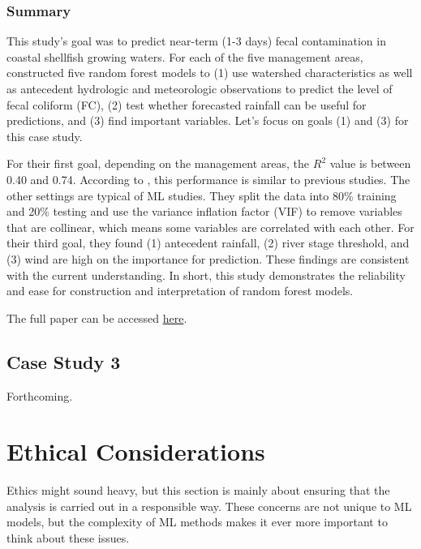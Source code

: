 \documentclass[
]{book}
\begin{document}
\hypertarget{summary-1}{%
\subsection{Summary}\label{summary-1}}

This study's goal was to predict near-term (1-3 days) fecal contamination in coastal shellfish growing waters. For each of the five management areas, \citet{chazal2024} constructed five random forest models to (1) use watershed characteristics as well as antecedent hydrologic and meteorologic observations to predict the level of fecal coliform (FC), (2) test whether forecasted rainfall can be useful for predictions, and (3) find important variables. Let's focus on goals (1) and (3) for this case study.

For their first goal, depending on the management areas, the \(R^2\) value is between 0.40 and 0.74. According to \citet{chazal2024}, this performance is similar to previous studies. The other settings are typical of ML studies. They split the data into 80\% training and 20\% testing and use the variance inflation factor (VIF) to remove variables that are collinear, which means some variables are correlated with each other. For their third goal, they found (1) antecedent rainfall, (2) river stage threshold, and (3) wind are high on the importance for prediction. These findings are consistent with the current understanding. In short, this study demonstrates the reliability and ease for construction and interpretation of random forest models.

The full paper can be accessed \href{https://www.sciencedirect.com/science/article/pii/S0025326X24000304?via\%3Dihub}{here}.

\hypertarget{case-study-3}{%
\section{Case Study 3}\label{case-study-3}}

Forthcoming.

\hypertarget{ethical-considerations}{%
\chapter{Ethical Considerations}\label{ethical-considerations}}

Ethics might sound heavy, but this section is mainly about ensuring that the analysis is carried out in a responsible way. These concerns are not unique to ML models, but the complexity of ML methods makes it ever more important to think about these issues.
\end{document}
